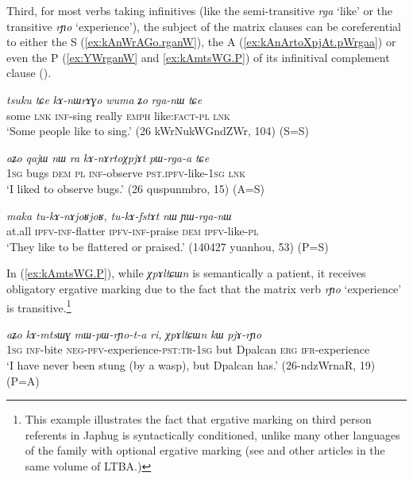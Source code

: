 \documentclass[oneside,a4paper,11pt]{article}
\newcommand{\ipa}[1]{\textit{\phon#1}}
\newcommand{\jpg}[2]{\ipa{#1} `#2'}
\newcommand{\refb}[1]{(\ref{#1})}
\begin{document}
Third, for most verbs taking infinitives (like the semi-transitive \jpg{rga}{like} or the transitive \jpg{rɲo}{experience}),  the subject of the matrix clauses can be coreferential to either the S  (\ref{ex:kAnWrAGo.rganW}), the A (\ref{ex:kAnArtoXpjAt.pWrgaa}) or even the P (\ref{ex:YWrganW} and \ref{ex:kAmtsWG.P})  of its infinitival complement clause (\citealt{jacques16relatives}).

 \begin{exe}
   \ex   \label{ex:kAnWrAGo.rganW} 
\gll
\ipa{tsuku}  	\ipa{tɕe}  	\ipa{kɤ-nɯrɤɣo}  	\ipa{wuma}  	\ipa{ʑo}  	\ipa{rga-nɯ}  	\ipa{tɕe}  \\
some \textsc{lnk} \textsc{inf}-sing really \textsc{emph} like:\textsc{fact-pl}  \textsc{lnk} \\
\glt `Some people like to sing.' (26 kWrNukWGndZWr, 104)  (S=S)
\end{exe}  
 
   \begin{exe}
   \ex   \label{ex:kAnArtoXpjAt.pWrgaa} 
\gll
  	\ipa{aʑo}  	\ipa{qajɯ}  	\ipa{nɯ} \ipa{ra}  	\ipa{kɤ-nɤrtoχpjɤt}  	\ipa{pɯ-rga-a}  	\ipa{tɕe}  	\\
  	\textsc{1sg} bugs \textsc{dem} \textsc{pl} \textsc{inf}-observe \textsc{pst.ipfv}-like-\textsc{1sg} \textsc{lnk}  \\
 \glt `I liked to observe bugs.' (26 quspunmbro, 15) (A=S)
     \end{exe}  
 
  \begin{exe}
   \ex   \label{ex:YWrganW} 
\gll
\ipa{maka}  	\ipa{tu-kɤ-nɤjoʁjoʁ,}  	\ipa{tu-kɤ-fstɤt}  	\ipa{nɯ}  	\ipa{ɲɯ-rga-nɯ}  \\
at.all \textsc{ipfv-inf}-flatter \textsc{ipfv-inf}-praise \textsc{dem} \textsc{ipfv}-like-\textsc{pl} \\
\glt `They like to be flattered or praised.' (140427 yuanhou, 53) (P=S)
    \end{exe}  
    
In \refb{ex:kAmtsWG.P}, while \ipa{χpɤltɕɯn} is semantically a patient, it receives obligatory ergative marking due to the fact that the matrix verb  \jpg{rɲo}{experience} is transitive.\footnote{This example illustrates the fact that ergative marking on third person referents in Japhug is syntactically conditioned, unlike many other languages of the family with optional ergative marking (see \citealt{delancey11ergativity} and other articles in the same volume of LTBA.)} 

      \begin{exe}
   \ex   \label{ex:kAmtsWG.P} 
\gll 
\ipa{aʑo} 	\ipa{kɤ-mtsɯɣ} 	\ipa{mɯ-pɯ-rɲo-t-a} 	\ipa{ri,} 	\ipa{χpɤltɕɯn} 	\ipa{kɯ} 	\ipa{pjɤ-rɲo} 	
 \\
\textsc{1sg} \textsc{inf}-bite \textsc{neg-pfv}-experience-\textsc{pst:tr-1sg} but Dpalcan \textsc{erg} \textsc{ifr}-experience \\
\glt `I have never been stung (by a wasp), but Dpalcan has.' (26-ndzWrnaR, 19) (P=A)
    \end{exe}  
\end{document}

